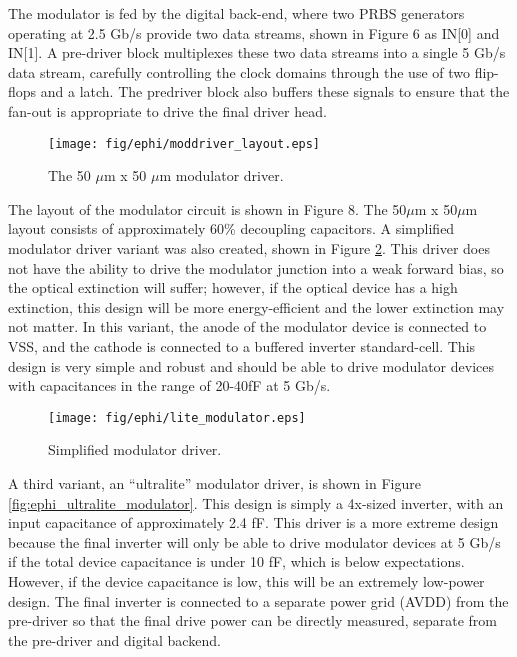 The modulator is fed by the digital back-end, where two PRBS generators operating at 2.5 Gb/s provide two data streams, shown in Figure 6 as IN[0] and IN[1].  A pre-driver block multiplexes these two data streams into a single 5 Gb/s data stream, carefully controlling the clock domains through the use of two flip-flops and a latch.  The predriver block also buffers these signals to ensure that the fan-out is appropriate to drive the final driver head.
 

	\begin{figure}[ht]
		\begin{center}
			\texttt{[image: fig/ephi/moddriver\_layout.eps]}
			\caption{\label{fig:ephi_moddriver_layout}The 50 $\mu$m x 50 $\mu$m modulator driver.}
		\end{center}
	\end{figure}

The layout of the modulator circuit is shown in Figure 8.  The 50$\mu$m x 50$\mu$m layout consists of approximately 60\% decoupling capacitors.
 	A simplified modulator driver variant was also created, shown in Figure \ref{fig:ephi_lite_modulator}.  This driver does not have the ability to drive the modulator junction into a weak forward bias, so the optical extinction will suffer; however, if the optical device has a high extinction, this design will be more energy-efficient and the lower extinction may not matter.   In this variant, the anode of the modulator device is connected to VSS, and the cathode is connected to a buffered inverter standard-cell.  This design is very simple and robust and should be able to drive modulator devices with capacitances in the range of 20-40fF at 5 Gb/s.

	\begin{figure}[ht]
		\begin{center}
			\texttt{[image: fig/ephi/lite\_modulator.eps]}
			\caption{\label{fig:ephi_lite_modulator}Simplified modulator driver.}
		\end{center}
	\end{figure}

A third variant, an “ultralite” modulator driver, is shown in Figure \ref{fig:ephi_ultralite_modulator}.  This design is simply a 4x-sized inverter, with an input capacitance of approximately 2.4 fF.  This driver is a more extreme design because the final inverter will only be able to drive modulator devices at 5 Gb/s if the total device capacitance is under 10 fF, which is below expectations.  However, if the device capacitance is low, this will be an extremely low-power design.  The final inverter is connected to a separate power grid (AVDD) from the pre-driver so that the final drive power can be directly measured, separate from the pre-driver and digital backend.

